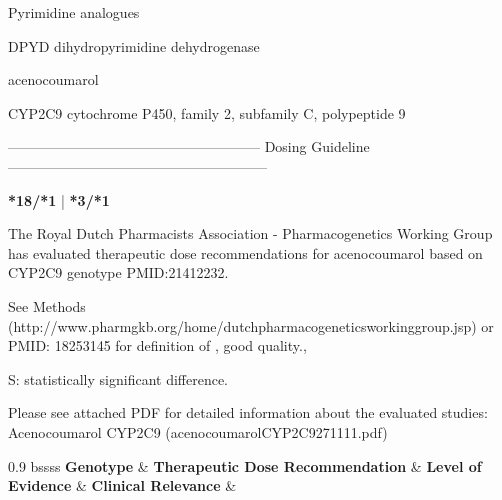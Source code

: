 \documentclass{resume} %
\begin{document}
\begin{rSection}{ Pyrimidine analogues }
\item[]
\begin{rSubsection}{ DPYD }{ dihydropyrimidine dehydrogenase }{}{}
\item[]


\end{rSubsection}

\end{rSection}\begin{rSection}{ acenocoumarol }
\item[]
\begin{rSubsection}{ CYP2C9 }{ cytochrome P450, family 2, subfamily C, polypeptide 9 }{}{}
\item[]
\item[] ------------------------------------------------------ Dosing Guideline --------------------------------------------------------\newline
\item[]
\item[] \textbf{ *18/*1 } | \textbf{ *3/*1 }
\item The Royal Dutch Pharmacists Association - Pharmacogenetics Working Group has evaluated therapeutic dose recommendations for acenocoumarol based on CYP2C9 genotype PMID:21412232.
 \newline
\item *See Methods (http://www.pharmgkb.org/home/dutchpharmacogeneticsworkinggroup.jsp) or PMID: 18253145 for definition of , good quality., 
 \newline
\item S: statistically significant difference.
 \newline
\item Please see attached PDF for detailed information about the evaluated studies: Acenocoumarol CYP2C9 (acenocoumarolCYP2C9271111.pdf) \newline
\vspace{1pt}\newline
		\scriptsize
		\begin{center}
		\begin{tabularx}{0.9\textwidth}{ bssss }
		\textbf{ Genotype }&\textbf{ Therapeutic Dose Recommendation }&\textbf{ Level of Evidence }&\textbf{ Clinical Relevance }&\textbf{
}\\
		\vspace{1pt}\\
		\hline \\
		\vspace{1pt}\\

\end{tabularx}
\end{center}
\end{rSubsection}
\end{rSection}
\end{document}
